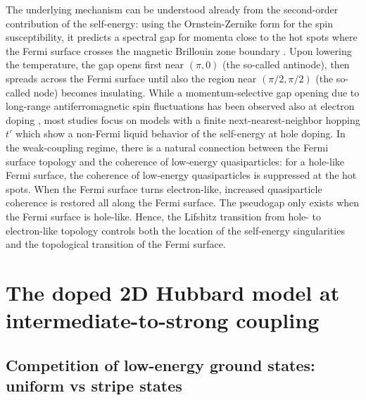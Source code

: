 \documentclass{ar-1col}
\begin{document}
The underlying mechanism can be understood already from the second-order contribution of the self-energy: using the Ornstein-Zernike form for the spin susceptibility,
it predicts a spectral gap for momenta close to the hot spots where the Fermi surface crosses the magnetic Brillouin zone boundary \cite{Vilk97,Wu17}.
Upon lowering the temperature, the gap opens first near $(\pi,0)$ (the so-called antinode), then spreads across the Fermi surface until also the region near $(\pi/2,\pi/2)$ (the so-called node) becomes insulating. %
While a momentum-selective gap opening due to long-range antiferromagnetic spin fluctuations has been observed also at electron doping \cite{Kyung04,Senechal04,Tremblay06}, most studies focus on models with a finite next-nearest-neighbor hopping $t'$ which show a non-Fermi liquid behavior of the self-energy at hole doping.
In the weak-coupling regime, there is a natural connection between the Fermi surface topology and the coherence of low-energy quasiparticles: for a hole-like Fermi surface, the coherence of low-energy quasiparticles is suppressed at the hot spots. When the Fermi surface turns electron-like, increased quasiparticle coherence is restored all along the Fermi surface. The pseudogap only exists when the Fermi surface is hole-like. Hence, the Lifshitz transition from hole- to electron-like topology controls both the location of the self-energy singularities and the topological transition of the Fermi surface.


\section{The doped 2D Hubbard model at intermediate-to-strong coupling}
\label{sec:strong}
\subsection{Competition of low-energy ground states: uniform vs stripe states}
\label{sec:competition}
\end{document}
